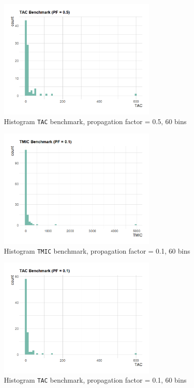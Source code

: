 \begin{figure}[ht!]
\begin{center}
\includegraphics[width=0.7\textwidth]{figures/benchmark/TAC_PF_0.5.png}
\caption{Histogram \texttt{TAC} benchmark, propagation factor = 0.5, 60 bins}
\label{fig:TAC-benchmark-0.5}
\end{center}
\end{figure}

\begin{figure}[ht!]
\begin{center}
  \includegraphics[width=0.7\textwidth]{figures/benchmark/TMIC_PF_0.1.png}
  \caption{Histogram \texttt{TMIC} benchmark, propagation factor = 0.1, 60 bins}
  \label{fig:TMIC-benchmark-0.1}
\end{center}
\end{figure}

\begin{figure}[ht!]
\begin{center}
\includegraphics[width=0.7\textwidth]{figures/benchmark/TAC_PF_0.1.png}
\caption{Histogram \texttt{TAC} benchmark, propagation factor = 0.1, 60 bins}
\label{fig:TAC-benchmark-0.1}
\end{center}
\end{figure}

